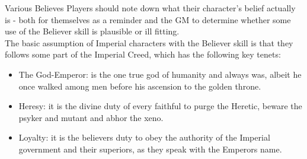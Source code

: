\begin{DndSidebar}{Various Believes}
Players should note down what their character's belief actually is - both for themselves as a reminder and the GM to determine whether some use of the Believer skill is plausible or ill fitting.\\
The basic assumption of Imperial characters with the Believer skill is that they follows some part of the Imperial Creed, which has the following key tenets:
\begin{itemize}
	\item The God-Emperor: is the one true god of humanity and always was, albeit he once walked among men before his ascension to the golden throne.
	\item Heresy: it is the divine duty of every faithful to purge the Heretic, beware the psyker and mutant and abhor the xeno.
	\item Loyalty: it is the believers duty to obey the authority of the Imperial government and their superiors, as they speak with the Emperors name.
\end{itemize}
\end{DndSidebar}

